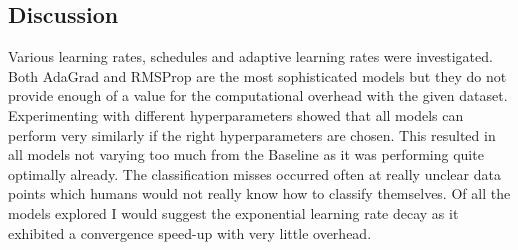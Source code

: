 \documentclass[12pt]{article}
\begin{document}
\subsection*{Discussion}
Various learning rates, schedules and adaptive learning rates were investigated. Both AdaGrad and RMSProp are the most sophisticated models but they do not provide enough of a value for the computational overhead with the given dataset. Experimenting with different hyperparameters showed that all models can perform very similarly if the right hyperparameters are chosen. This resulted in all models not varying too much from the Baseline as it was performing quite optimally already. The classification misses occurred often at really unclear data points which humans would not really know how to classify themselves. Of all the models explored I would suggest the exponential learning rate decay as it exhibited a convergence speed-up with very little overhead.
\end{document}
